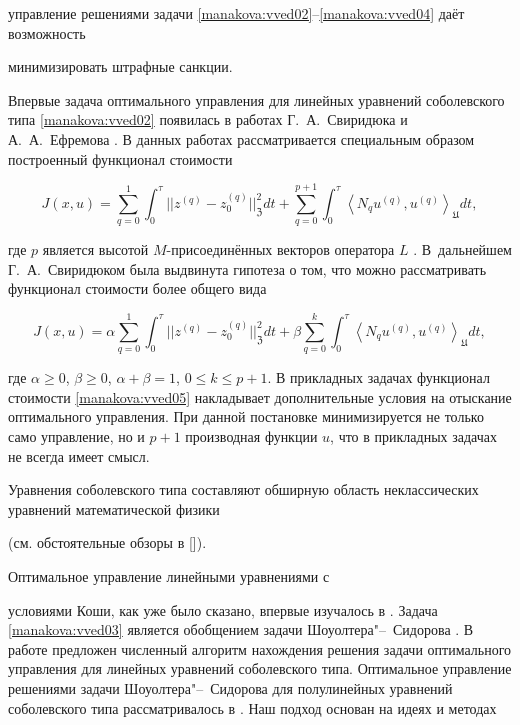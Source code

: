 управление решениями задачи \eqref{manakova:vved02}--\eqref{manakova:vved04} даёт возможность

минимизировать штрафные санкции.



Впервые задача оптимального управления для линейных уравнений соболевского типа \eqref{manakova:vved02} появилась в работах Г.~А.~Свиридюка и А.~А.~Ефремова \cite[гл. 7]{manakova:bib:monosvf}. В данных работах рассматривается специальным образом построенный функционал стоимости

\begin{equation}\label{manakova:vved05}

J(x,u) = \sum^{1}_{q=0} \int^{\tau}_{0}||z^{(q)} - z_0^{(q)}||^2_\mathfrak Z dt + \sum^{p+1}_{q=0}

\int^{\tau}_{0}\left\langle N_q u^{(q)},

u^{(q)}\right\rangle_\mathfrak U dt,

\end{equation}

где $p$ является высотой $M$-присоединённых векторов оператора $L$ \cite[гл. 3]{manakova:bib:monosvf}. В~дальнейшем Г.~А.~Свиридюком была выдвинута гипотеза о том, что можно рассматривать функционал стоимости более общего вида

$$

J(x,u) = \alpha\sum^{1}_{q=0} \int^{\tau}_{0}||z^{(q)} -

z_0^{(q)}||^2_\mathfrak Z dt + \beta\sum^{k}_{q=0}

\int^{\tau}_{0}\left\langle N_q u^{(q)},

u^{(q)}\right\rangle_\mathfrak U dt,

$$

где $\alpha\geq 0$, $\beta\geq0$, $\alpha+\beta=1$, $0\leq k \leq p+1$. В прикладных задачах функционал стоимости \eqref{manakova:vved05} накладывает дополнительные условия на отыскание оптимального управления. При данной постановке минимизируется не только само управление, но и $p+1$ производная функции $u$, что в прикладных задачах не всегда имеет смысл.



Уравнения соболевского типа составляют обширную область неклассических уравнений математической физики

(см. обстоятельные обзоры в []).

Оптимальное управление линейными уравнениями с

условиями Коши, как уже было сказано, впервые изучалось в \cite[гл. 7]{manakova:bib:monosvf}. Задача \eqref{manakova:vved03} является обобщением задачи Шоуолтера"--~Сидорова \cite{manakova:bib:svzag}. В работе \cite{manakova:bib:keller} предложен численный алгоритм нахождения решения задачи оптимального управления для линейных уравнений соболевского типа. Оптимальное управление решениями задачи Шоуолтера"--~Сидорова для полулинейных уравнений соболевского типа рассматривалось в \cite{manakova:bib:man}. Наш подход основан на идеях и методах

